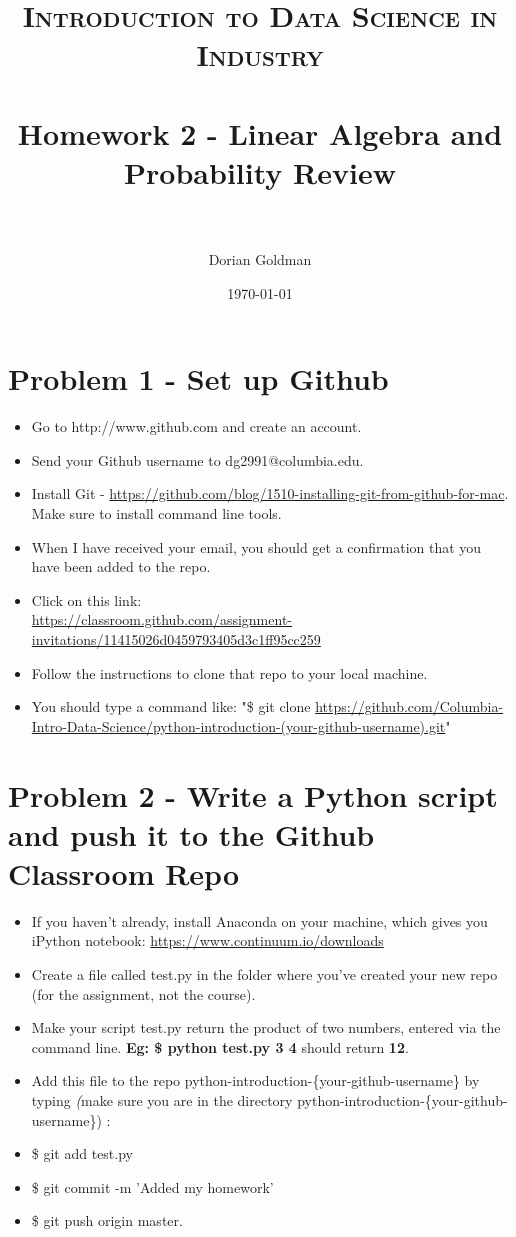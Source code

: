 \documentclass[paper=a4, fontsize=11pt]{scrartcl} %
\title{	
\normalfont \normalsize 
\textsc{Introduction to Data Science in Industry} \\ [25pt] %
\horrule{0.5pt} \\[0.4cm] %
\huge Homework 2 - Linear Algebra and Probability Review\\ %
\horrule{2pt} \\[0.5cm] %
}
\author{Dorian Goldman} %
\date{\normalsize\today} %
\numberwithin{equation}{section} %
\numberwithin{figure}{section} %
\numberwithin{table}{section} %
\begin{document}
\maketitle %


\section{Problem 1 - Set up Github}


\begin{itemize}
\item Go to http://www.github.com and create an account.
\item Send your Github username to dg2991@columbia.edu.
\item Install Git - \url{https://github.com/blog/1510-installing-git-from-github-for-mac}. Make sure to install command line tools. 
\item When I have received your email, you should get a confirmation that you have been added to the repo.
\item Click on this link:\\ \url{https://classroom.github.com/assignment-invitations/11415026d0459793405d3c1ff95cc259}
\item Follow the instructions to clone that repo to your local machine.
\item You should type a command like: "\$ git clone \url{https://github.com/Columbia-Intro-Data-Science/python-introduction-(your-github-username).git}"
\end{itemize}




\section{Problem 2 - Write a Python script and push it to the Github Classroom Repo}

\begin{itemize}
\item If you haven't already, install Anaconda on your machine, which gives you iPython notebook: \url{https://www.continuum.io/downloads}
\item Create a file called test.py in the folder where you've created your new repo (for the assignment, not the course).
\item Make your script test.py return the product of two numbers, entered via the command line. \textbf{Eg: \$ python test.py 3 4 } should return \textbf{12}. 
\item Add this file to the repo python-introduction-\{your-github-username\} by typing \emph(make sure you are in the directory python-introduction-\{your-github-username\}) :
\item \$ git add test.py
\item \$ git commit -m 'Added my homework'
\item \$ git push origin master.
\end{itemize}
\end{document}

